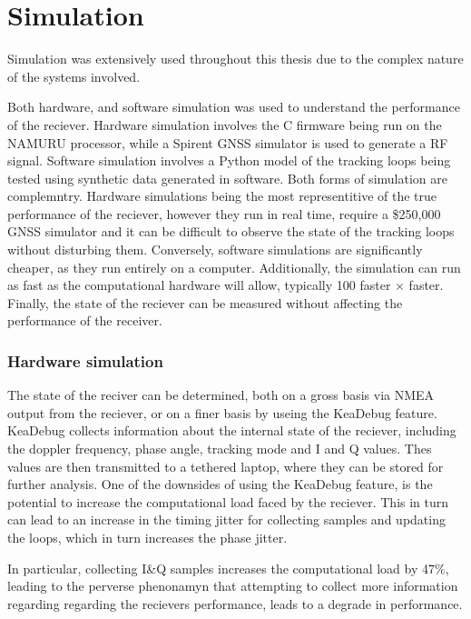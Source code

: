 \chapter{Simulation}\label{ch:Simulation}

Simulation was extensively used throughout this thesis due to the complex nature of the systems involved. 

Both hardware, and software simulation was used to understand the performance of the reciever. Hardware simulation involves the C firmware being run on the \ac{NAMURU} processor, while a Spirent GNSS simulator is used to generate a RF signal. Software simulation involves a Python model of the tracking loops being tested using synthetic data generated in software. Both forms of simulation are complemntry. Hardware simulations being the most representitive of the true performance of the reciever, however they run in real time, require a \$250,000 GNSS simulator and it can be difficult to observe the state of the tracking loops without disturbing them. Conversely, software simulations are significantly cheaper, as they run entirely on a computer. Additionally, the simulation can run as fast as the computational hardware will allow, typically 100 faster $\times$ faster. Finally, the state of the reciever can be measured without affecting the performance of the receiver.

\subsection{Hardware simulation}
The state of the reciver can be determined, both on a gross basis via NMEA output from the reciever, or on a finer basis by useing the KeaDebug feature. KeaDebug collects information about the internal state of the reciever, including the doppler frequency, phase angle, tracking mode and I and Q values. Thes values are then transmitted to a tethered laptop, where they can be stored for further analysis. One of the downsides of using the KeaDebug feature, is the potential to increase the computational load faced by the reciever. This in turn can lead to an increase in the timing jitter for collecting samples and updating the loops, which in turn increases the phase jitter. 

In particular, collecting I\&Q samples increases the computational load by 47\%, leading to the perverse phenonamyn that attempting to collect more information regarding regarding the recievers performance, leads to a degrade in performance.

